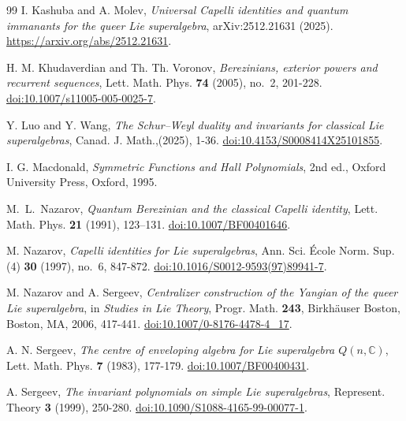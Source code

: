 \documentclass[11pt]{amsart}
\numberwithin{equation}{section}
\theoremstyle{definition}
\theoremstyle{remark}
\newcommand{\C}{\mathbb C}
\begin{document}
\begin{thebibliography}{99}
I. Kashuba and A. Molev,
\emph{Universal Capelli identities and quantum immanants for the queer
Lie superalgebra}, arXiv:2512.21631 (2025).
\url{https://arxiv.org/abs/2512.21631}.

H. M. Khudaverdian and Th. Th. Voronov,
\emph{Berezinians, exterior powers and recurrent sequences},
Lett. Math. Phys. \textbf{74} (2005), no.~2, 201-228.
\href{https://doi.org/10.1007/s11005-005-0025-7}
{doi:10.1007/s11005-005-0025-7}.

Y. Luo and Y. Wang,
\emph{The Schur--Weyl duality and invariants for classical Lie
superalgebras},
Canad. J. Math.,(2025), 1-36.
\href{https://doi.org/10.4153/S0008414X25101855}
{doi:10.4153/S0008414X25101855}.

I. G. Macdonald,
\emph{Symmetric Functions and Hall Polynomials}, 2nd ed.,
Oxford University Press, Oxford, 1995.

M.~L.~Nazarov,
\emph{Quantum Berezinian and the classical Capelli identity},
Lett. Math. Phys. \textbf{21} (1991), 123--131.
\href{https://doi.org/10.1007/BF00401646}
{doi:10.1007/BF00401646}.

M. Nazarov,
\emph{Capelli identities for Lie superalgebras},
Ann. Sci. \'{E}cole Norm. Sup. (4) \textbf{30} (1997), no.~6,
847-872.
\href{https://doi.org/10.1016/S0012-9593(97)89941-7}
{doi:10.1016/S0012-9593(97)89941-7}.

M. Nazarov and A. Sergeev,
\emph{Centralizer construction of the Yangian of the queer Lie
superalgebra},
in \emph{Studies in Lie Theory}, Progr. Math. \textbf{243},
Birkh\"auser Boston, Boston, MA, 2006, 417-441.
\href{https://doi.org/10.1007/0-8176-4478-4_17}
{doi:10.1007/0-8176-4478-4\_17}.

A. N. Sergeev,
\emph{The centre of enveloping algebra for Lie superalgebra
\(Q(n,\C)\)},
Lett. Math. Phys. \textbf{7} (1983), 177-179.
\href{https://doi.org/10.1007/BF00400431}
{doi:10.1007/BF00400431}.

A. Sergeev,
\emph{The invariant polynomials on simple Lie superalgebras},
Represent. Theory \textbf{3} (1999), 250-280.
\href{https://doi.org/10.1090/S1088-4165-99-00077-1}
{doi:10.1090/S1088-4165-99-00077-1}.


\end{thebibliography}
\end{document}
